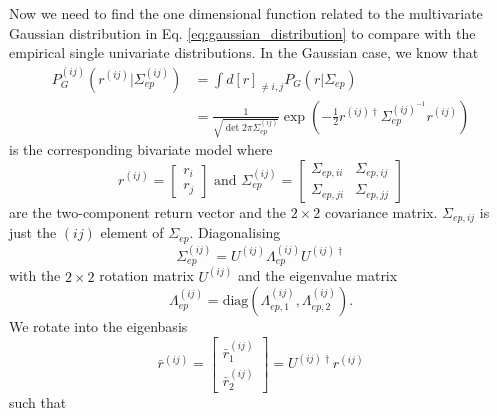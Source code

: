 Now we need to find the one dimensional function related to the multivariate
Gaussian distribution in Eq. \ref{eq:gaussian_distribution} to compare with the
empirical  single univariate distributions. In the Gaussian case, we know that
\begin{align}
    P_{G}^{\left( ij \right)} \left( r^{\left( ij \right)} | \Sigma_{ep}^{\left( ij \right)} \right) &= \int d \left[ r \right]_{\ne i,j} P_{G} \left( r | \Sigma_{ep} \right) \\
    &= \frac{1}{\sqrt{\det 2 \pi \Sigma_{ep}^{\left( ij \right)}}} \exp \left( -\frac{1}{2} r^{\left( ij \right) \dagger} \Sigma_{ep}^{\left( ij \right)^{ - 1}} r^{\left( ij \right)} \right)
\end{align}
is the corresponding bivariate model where
\begin{equation}
    r^{\left(ij\right)}=\left[\begin{array}{c}
    r_{i}\\
    r_{j}
    \end{array}\right]\text{ and } \Sigma_{ep}^{\left(ij\right)}
    =\left[\begin{array}{cc}
    \Sigma_{ep,ii} & \Sigma_{ep,ij}\\
    \Sigma_{ep,ji} & \Sigma_{ep,jj}
    \end{array}\right]
\end{equation}
are the two-component return vector and the $2 \times 2$ covariance matrix.
$\Sigma_{ep,ij}$ is just the $\left( ij \right)$ element of $\Sigma_{ep}$.
Diagonalising
\begin{equation}
    \Sigma_{ep}^{\left(ij\right)}=U^{\left(ij\right)}
    \Lambda_{ep}^{\left(ij\right)}U^{\left(ij\right)\dagger}
\end{equation}
with the $2 \times 2$ rotation matrix $U^{\left( ij \right)}$ and the
eigenvalue matrix
\begin{equation}
    \Lambda_{ep}^{\left( ij \right)} = \text{diag}
    \left( \Lambda_{ep,1}^{\left( ij \right)},
    \Lambda_{ep,2}^{\left( ij \right)} \right).
\end{equation}
We rotate into the eigenbasis
\begin{equation}
    \bar{r}^{\left(ij\right)}=\left[\begin{array}{c}
    \bar{r}_{1}^{\left(ij\right)}\\
    \bar{r}_{2}^{\left(ij\right)}
    \end{array}\right]=U^{\left(ij\right)\dagger}r^{\left(ij\right)}
\end{equation}
such that
